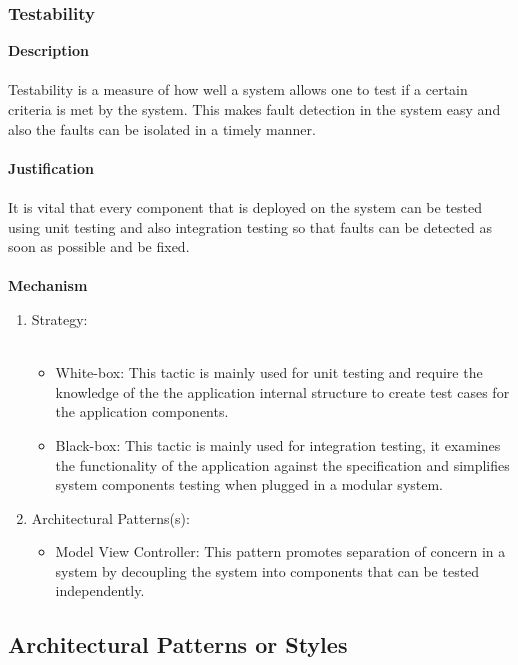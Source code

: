 \documentclass[hidelinks, 12pt, oneside]{article}
\begin{document}
			\subsubsection*{Testability}
			\textbf{Description}\\\\
			Testability is a measure of how well a system allows one to test if a certain criteria is met by the system. This makes fault detection in the system easy and also the faults can be isolated in a timely manner.\\\\
			\textbf{Justification}\\\\
			It is vital that every component that is deployed on the system can be tested using unit testing and also integration testing so that faults can be detected as soon as possible and be fixed. \\\\
			\textbf{Mechanism}
			\begin{enumerate}
				\item Strategy:\\\\
				\begin{itemize}
				\item White-box: This tactic is mainly used for unit testing and require the knowledge of the the application internal structure to create test cases for the application components.
				\item Black-box: This tactic is mainly used for integration testing, it examines the functionality of the application against the specification and simplifies system components testing when plugged in a modular system.
				\end{itemize}
				\item Architectural Patterns(s):
				\begin{itemize}
				\item Model View Controller: This pattern promotes separation of concern in a system by decoupling the system into components that can be tested independently.   
				\end{itemize}
			\end{enumerate}	
    \newpage
    \subsection{Architectural Patterns or Styles}
\end{document}
